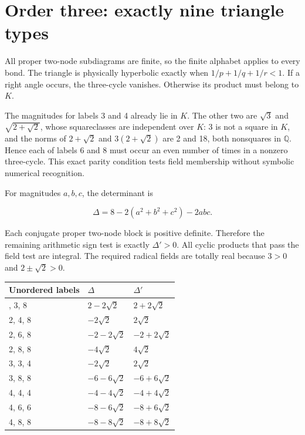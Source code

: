 \documentclass[
  10pt,
]{report}
\newcounter{none} %
\begin{document}
\section{Order three: exactly nine triangle
types}\label{order-three-exactly-nine-triangle-types}

All proper two-node subdiagrams are finite, so the finite alphabet
applies to every bond. The triangle is physically hyperbolic exactly
when \(1/p+1/q+1/r<1\). If a right angle occurs, the three-cycle
vanishes. Otherwise its product must belong to \(K\).

The magnitudes for labels 3 and 4 already lie in \(K\). The other two
are \(\sqrt3\) and \(\sqrt{2+\sqrt2}\), whose squareclasses are
independent over \(K\): 3 is not a square in \(K\), and the norms of
\(2+\sqrt2\) and \(3(2+\sqrt2)\) are 2 and 18, both nonsquares in
\(\mathbb Q\). Hence each of labels 6 and 8 must occur an even number of
times in a nonzero three-cycle. This exact parity condition tests field
membership without symbolic numerical recognition.

For magnitudes \(a,b,c\), the determinant is

\[
\Delta=8-2(a^2+b^2+c^2)-2abc.
\]

Each conjugate proper two-node block is positive definite. Therefore the
remaining arithmetic sign test is exactly \(\Delta'>0\). All cyclic
products that pass the field test are integral. The required radical
fields are totally real because \(3>0\) and \(2\pm\sqrt2>0\).

{\def\LTcaptype{none} %
\begin{longtable}[]{@{}lll@{}}
\toprule\noalign{}
Unordered labels & \(\Delta\) & \(\Delta'\) \\
\midrule\noalign{}
\endhead
\bottomrule\noalign{}
\endlastfoot
2, 3, 8 & \(2-2\sqrt2\) & \(2+2\sqrt2\) \\
2, 4, 8 & \(-2\sqrt2\) & \(2\sqrt2\) \\
2, 6, 8 & \(-2-2\sqrt2\) & \(-2+2\sqrt2\) \\
2, 8, 8 & \(-4\sqrt2\) & \(4\sqrt2\) \\
3, 3, 4 & \(-2\sqrt2\) & \(2\sqrt2\) \\
3, 8, 8 & \(-6-6\sqrt2\) & \(-6+6\sqrt2\) \\
4, 4, 4 & \(-4-4\sqrt2\) & \(-4+4\sqrt2\) \\
4, 6, 6 & \(-8-6\sqrt2\) & \(-8+6\sqrt2\) \\
4, 8, 8 & \(-8-8\sqrt2\) & \(-8+8\sqrt2\) \\
\end{longtable}
}
\end{document}
